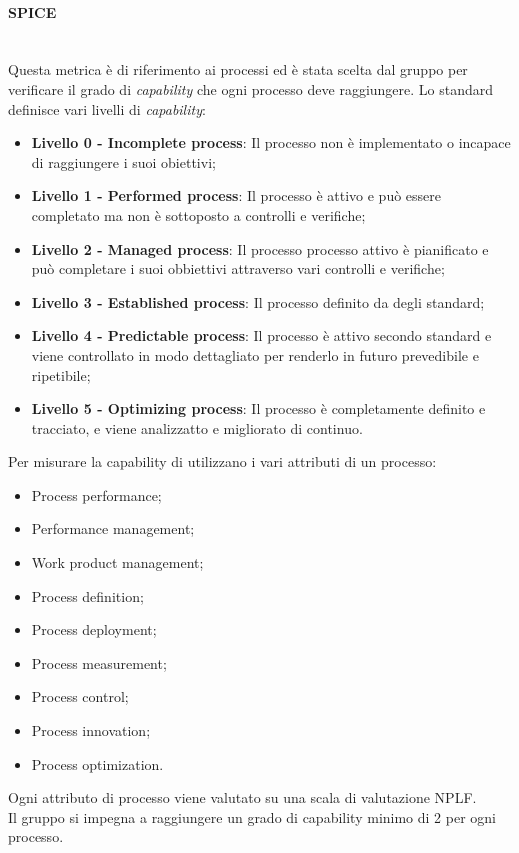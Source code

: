 \paragraph{SPICE}\mbox{}\\
Questa metrica è di riferimento ai processi ed è stata scelta dal gruppo per verificare il grado di \textit{capability} che ogni processo deve raggiungere. Lo standard definisce vari livelli di \textit{capability}:
\begin{itemize}
	\item \textbf{Livello 0 - Incomplete process}: Il processo non è implementato o incapace di raggiungere i suoi obiettivi;
	\item \textbf{Livello 1 - Performed process}: Il processo è attivo e può essere completato ma non è sottoposto a controlli e verifiche;
	\item \textbf{Livello 2 - Managed process}: Il processo processo attivo è pianificato e può completare i suoi obbiettivi attraverso vari controlli e verifiche;
	\item \textbf{Livello 3 - Established process}: Il processo definito da degli standard;
	\item \textbf{Livello 4 - Predictable process}: Il processo è attivo secondo standard e viene controllato in modo dettagliato per renderlo in futuro prevedibile e ripetibile;
	\item \textbf{Livello 5 - Optimizing process}: Il processo è completamente definito e tracciato, e viene analizzatto e migliorato di continuo.
\end{itemize}
Per misurare la capability di utilizzano i vari attributi di un processo:
\begin{itemize}
	\item Process performance;
	\item Performance management;
	\item Work product management;
	\item Process definition;
	\item Process deployment;
	\item Process measurement;
	\item Process control;
	\item Process innovation;
	\item Process optimization.
\end{itemize}
Ogni attributo di processo viene valutato su una scala di valutazione NPLF.\\ Il gruppo si impegna a raggiungere un grado di capability minimo di 2 per ogni processo.
